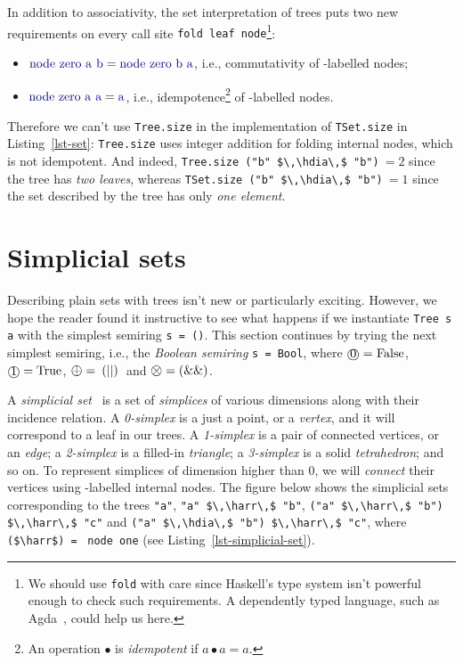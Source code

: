 \documentclass[english,submission]{programming}
\newcommand{\code}[1]{\lstinline[mathescape]|#1|}
\newcommand{\hcode}[1]{{\color{darkblue} \lstinline[keywordstyle={}]|#1|}} %
\newcommand{\hdia}{\,\text{\raisebox{-0.2mm}{\Large\color{darkblue} $\diamond$}}\,}
\newcommand{\harr}{\,\text{\color{darkblue} $\rightarrow$}\,}
\newcommand{\add}{\text{\raisebox{-0.1mm}{\large $\oplus$}}}
\newcommand{\mul}{\text{\raisebox{-0.1mm}{\large $\otimes$}}}
\newcommand{\zero}{\raisebox{-0.2mm}{\textcircled{0}}\xspace}
\newcommand{\one}{\raisebox{-0.2mm}{\textcircled{1}}\xspace}
\begin{document}
\noindent
In addition to associativity, the set interpretation of trees puts two new
requirements on every call site \hcode{fold leaf node}\footnote{
    We should use \hcode{fold} with care since Haskell's type system isn't
    powerful enough to check such requirements. A dependently typed language,
    such as Agda~\cite{2007_norell_agda}, could help us here.
}:

\begin{itemize}
    \item $\text{\hcode{node zero a b}} = \text{\hcode{node zero b a}}$, i.e.,
          commutativity of \zero-labelled nodes;
    \item $\text{\hcode{node zero a a}} = \text{\hcode{a}}$, i.e.,
    idempotence\footnote{
         An operation $\bullet$ is \emph{idempotent} if $a \bullet a = a$.
    } of \zero-labelled nodes.
\end{itemize}

\noindent
Therefore we can't use \hcode{Tree.}\code{size} in the implementation of
\hcode{TSet.}\code{size} in Listing~\ref{lst-set}: \hcode{Tree.}\code{size} uses
integer addition for folding internal nodes, which is not idempotent. And
indeed, \hcode{Tree.}\code{size ("b" $\,\hdia\,$ "b")}$\ =2$ since the tree has
\emph{two leaves}, whereas \hcode{TSet.}\code{size ("b" $\,\hdia\,$ "b")}$\ = 1$
since the set described by the tree has only \emph{one element}.

\section{Simplicial sets}\label{sec-simplicial-set}

Describing plain sets with trees isn't new or particularly exciting. However, we
hope the reader found it instructive to see what happens if we instantiate
\hcode{Tree s a} with the simplest semiring \hcode{s = ()}. This section
continues by trying the next simplest semiring, i.e., the
\emph{Boolean semiring} \hcode{s = Bool}, where $\zero = \text{\code{False}}$,
$\one = \text{\code{True}}$, $\add = \text{\code{(\|\|)}}$ and
$\mul = \text{\code{(&&)}}$.

A \emph{simplicial set}~\cite{friedman_simplicial_sets} is a set of
\emph{simplices} of various dimensions along with their incidence relation.
A \emph{0-simplex} is a just a point, or a \emph{vertex}, and it will correspond
to a leaf in our trees. A \emph{1-simplex} is a pair of connected vertices, or
an \emph{edge}; a \emph{2-simplex} is a filled-in \emph{triangle}; a
\emph{3-simplex} is a solid \emph{tetrahedron}; and so on. To represent
simplices of dimension higher than $0$, we will \emph{connect} their vertices
using \one-labelled internal nodes. The figure below shows the simplicial sets
corresponding to the trees \code{"a"}, \code{"a" $\,\harr\,$ "b"},
\code{("a" $\,\harr\,$ "b") $\,\harr\,$ "c"} and
\code{("a" $\,\hdia\,$ "b") $\,\harr\,$ "c"}, where
\code{($\harr$)}~\code{=}~\hcode{node one} (see Listing~\ref{lst-simplicial-set}).
\end{document}
